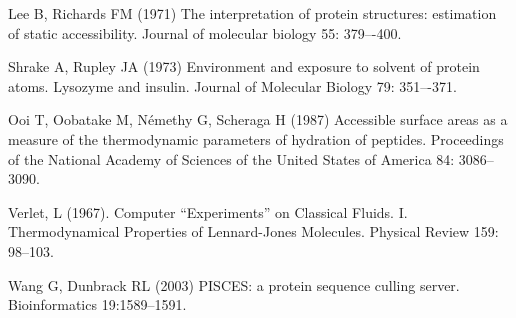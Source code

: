 \documentclass[a4paper,11pt]{article}
\begin{document}
\begin{thebibliography}{50}

  Lee B, Richards FM (1971) The interpretation of protein
  structures: estimation of static accessibility. Journal of molecular
  biology 55: 379–-400.

  Shrake A, Rupley JA (1973) Environment and exposure to
  solvent of protein atoms. Lysozyme and insulin. Journal of Molecular
  Biology 79: 351–-371.

  Ooi T, Oobatake M, Némethy G, Scheraga H (1987)
  Accessible surface areas as a measure of the thermodynamic
  parameters of hydration of peptides. Proceedings of the National
  Academy of Sciences of the United States of America 84: 3086–3090.

  Verlet, L (1967). Computer ``Experiments'' on Classical
  Fluids. I. Thermodynamical Properties of Lennard-Jones
  Molecules. Physical Review 159: 98--103.

  Wang G, Dunbrack RL (2003) PISCES: a protein sequence culling server. 
  Bioinformatics 19:1589--1591.

\end{thebibliography}
\end{document}
